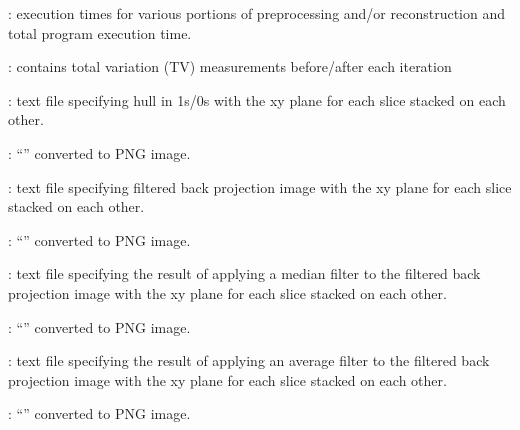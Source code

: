 \begin{tcbfunctionenv}
\begin{tcbparagraph}
\begin{deepList}[labelindent=1pt, leftmargin=*]
\begin{deepList}[labelindent=1pt, leftmargin=*]
\begin{deepList}[labelindent=1pt, leftmargin=*]
\begin{deepList}[labelindent=1pt, leftmargin=*]
\begin{deepList}[labelindent=1pt, leftmargin=*]
\begin{deepList}[labelindent=1pt, leftmargin=*]
\begin{deepList}[labelindent=1pt, leftmargin=*]
\begin{deepList}[labelindent=1pt, leftmargin=*]
\begin{deepList}[labelindent=1pt, leftmargin=*]
                                        \item {} : execution times for various portions of preprocessing and/or reconstruction and total program execution time.
                                        \item {} : contains total variation (TV) measurements before/after each iteration
                                        \item {} : text file specifying hull in 1s/0s with the xy plane for each slice stacked on each other.
                                        \item {} : ``'' converted to PNG image.
                                        \item {} : text file specifying filtered back projection image with the xy plane for each slice stacked on each other.
                                        \item {} : ``'' converted to PNG image.
                                        \item {} : text file specifying the result of applying a median filter to the filtered back projection image with the xy plane for each slice stacked on each other.
                                        \item {} : ``'' converted to PNG image.
                                        \item {} : text file specifying the result of applying an average filter to the filtered back projection image with the xy plane for each slice stacked on each other.
                                        \item {} : ``'' converted to PNG image.

\end{deepList}
\end{deepList}
\end{deepList}
\end{deepList}
\end{deepList}
\end{deepList}
\end{deepList}
\end{deepList}
\end{deepList}
\end{tcbparagraph}
\end{tcbfunctionenv}
